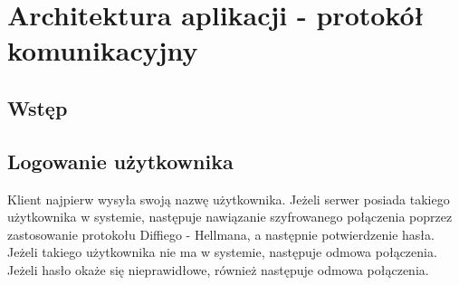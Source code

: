 \documentclass{article}
\begin{document}
	\section{Architektura aplikacji - protokół komunikacyjny}
	
	\subsection{Wstęp}
	
	\subsection{Logowanie użytkownika}
	Klient najpierw wysyła swoją nazwę użytkownika. Jeżeli serwer posiada takiego użytkownika w systemie, następuje nawiązanie szyfrowanego połączenia poprzez zastosowanie protokołu Diffiego - Hellmana, a następnie potwierdzenie hasła. Jeżeli takiego użytkownika nie ma w systemie, następuje odmowa połączenia. Jeżeli hasło okaże się nieprawidłowe, również następuje odmowa połączenia. 
	
\end{document}
